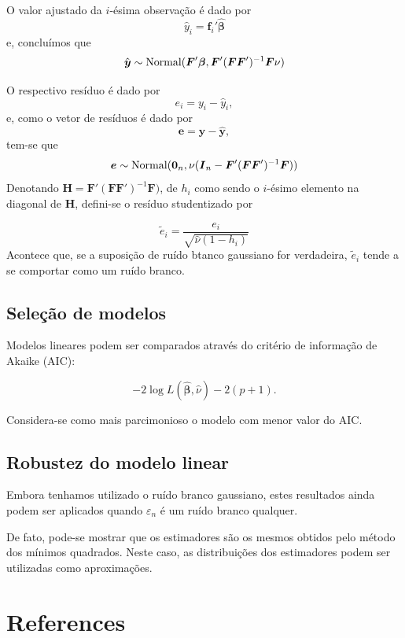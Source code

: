 \documentclass[
  letterpaper,
  DIV=11,
  numbers=noendperiod]{scrreprt}
\newlength{\cslhangindent}
\newlength{\cslentryspacingunit} %
\newenvironment{CSLReferences}[2] %
 {%
  \setlength{\parindent}{0pt}
  \ifodd #1
  \let\oldpar\par
  \def\par{\hangindent=\cslhangindent\oldpar}
  \fi
  \setlength{\parskip}{#2\cslentryspacingunit}
 }%
 {}
\theoremstyle{plain}
\theoremstyle{definition}
\theoremstyle{definition}
\theoremstyle{remark}
\begin{document}
O valor ajustado da \(i\)-ésima observação é dado por \[\begin{equation}
        \hat{y}_i=\boldsymbol{f}_i' \hat{\boldsymbol{\beta}}
        \end{equation}\] e, concluímos que
\[\hat{\boldsymbol{y}}\sim \hbox{Normal}( \boldsymbol{F}'\boldsymbol{\beta}, \boldsymbol{F}'(\boldsymbol{F}\boldsymbol{F}')^{-1}\boldsymbol{F}\nu )\]

O respectivo resíduo é dado por \[e_i=y_i - \hat{y}_i,\] e, como o vetor
de resíduos é dado por
\[\boldsymbol{e}=\boldsymbol{y}-\hat{\boldsymbol{y}},\] tem-se que
\[\boldsymbol{e}\sim \hbox{Normal}(\boldsymbol{0}_n,\nu(\boldsymbol{I}_n-\boldsymbol{F}'(\boldsymbol{F}\boldsymbol{F}')^{-1}\boldsymbol{F}))\]
Denotando
\(\boldsymbol{H}=\boldsymbol{F}'(\boldsymbol{F}\boldsymbol{F}')^{-1}\boldsymbol{F})\),
de \(h_i\) como sendo o \(i\)-ésimo elemento na diagonal de
\(\boldsymbol{H}\), defini-se o resíduo studentizado por

\[\tilde{e}_i=\frac{e_i}{\sqrt{\hat{\nu}(1-h_i)}}\] Acontece que, se a
suposição de ruído btanco gaussiano for verdadeira, \(\tilde{e}_i\)
tende a se comportar como um ruído branco.

\hypertarget{seleuxe7uxe3o-de-modelos}{%
\section{Seleção de modelos}\label{seleuxe7uxe3o-de-modelos}}

Modelos lineares podem ser comparados através do critério de informação
de Akaike (AIC):

\[-2\log L(\hat{\boldsymbol{\beta}},\hat{\nu}) - 2(p+1).\]

Considera-se como mais parcimonioso o modelo com menor valor do AIC.

\hypertarget{robustez-do-modelo-linear}{%
\section{Robustez do modelo linear}\label{robustez-do-modelo-linear}}

Embora tenhamos utilizado o ruído branco gaussiano, estes resultados
ainda podem ser aplicados quando \(\varepsilon_n\) é um ruído branco
qualquer.

De fato, pode-se mostrar que os estimadores são os mesmos obtidos pelo
método dos mínimos quadrados. Neste caso, as distribuições dos
estimadores podem ser utilizadas como aproximações.


\hypertarget{references}{%
\chapter*{References}\label{references}}


\hypertarget{refs}{}
\begin{CSLReferences}{0}{0}
\end{CSLReferences}
\end{document}
